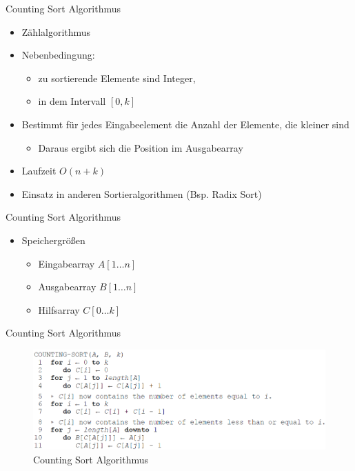\documentclass[handout]{beamer}
\begin{document}
\begin{frame}{Counting Sort Algorithmus}
  \begin{itemize}
    \item Zählalgorithmus
    \item Nebenbedingung:
    \begin{itemize}
      \item zu sortierende Elemente sind Integer,
      \item in dem Intervall $[0,k]$
    \end{itemize}
    \item Bestimmt für jedes Eingabeelement die Anzahl der Elemente, die kleiner sind
    \begin{itemize}
      \item Daraus ergibt sich die Position im Ausgabearray
    \end{itemize}
    \item Laufzeit $O(n+k)$
    \item Einsatz in anderen Sortieralgorithmen (Bsp. Radix Sort)
  \end{itemize}
\end{frame}

\begin{frame}{Counting Sort Algorithmus}
  \begin{itemize}
    \item Speichergrößen
    \begin{itemize}
        \item Eingabearray $A[1\dots n]$
        \item Ausgabearray $B[1\dots n]$
        \item Hilfsarray $C[0\dots k]$
    \end{itemize}
  \end{itemize}
\end{frame}

\begin{frame}{Counting Sort Algorithmus}
  \begin{figure}[htb]
    \centering
    \includegraphics[width=1.1\textwidth]{img/counting-sort}
    \caption{Counting Sort Algorithmus \cite{CormenLeisersonRivestStein200107}} %
  \end{figure}
\end{frame}
\end{document}
